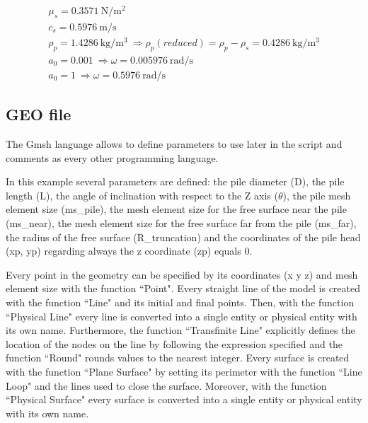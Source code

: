 \documentclass[a4]{article}
\begin{document}
\begin{equation}
	\begin{array}{l}
		\mu_s = 0.3571 \medspace \mathrm{N/m^2} \\
		c_s = 0.5976 \medspace \mathrm{m/s} \\
		\rho_p = 1.4286 \medspace \mathrm{kg/m^3} \medspace \Longrightarrow \rho_p (reduced) = \rho_p - \rho_s = 0.4286 \medspace \mathrm{kg/m^3}\\
		a_0 = 0.001 \medspace \Longrightarrow \omega = 0.005976 \medspace \mathrm{rad/s}\\
		a_0 = 1 \medspace \Longrightarrow \omega = 0.5976 \medspace \mathrm{rad/s}
	\end{array}
\end{equation}

\subsection{GEO file}

The Gmsh language allows to define parameters to use later in the script and comments as every other programming language. 

In this example several parameters are defined: the pile diameter (D), the pile length (L), the angle of inclination with respect to the Z axis ($\theta$), the pile mesh element size (ms\_pile), the mesh element size for the free surface near the pile (ms\_near), the mesh element size for the free surface far from the pile (ms\_far), the radius of the free surface (R\_truncation) and the coordinates of the pile head (xp, yp) regarding always the z coordinate (zp) equals 0. 

Every point in the geometry can be specified by its coordinates (x y z) and mesh element size with the function ``Point". Every straight line of the model is created with the function ``Line" and its initial and final points. Then, with the function ``Physical Line" every line is converted into a single entity or physical entity with its own name. Furthermore, the function ``Transfinite Line" explicitly defines the location of the nodes on the line by following the expression specified and the function ``Round" rounds values to the nearest integer. Every surface is created with the function ``Plane Surface" by setting its perimeter with the function ``Line Loop" and the lines used to close the surface. Moreover, with the function ``Physical Surface" every surface is converted into a single entity or physical entity with its own name.  
\end{document}
